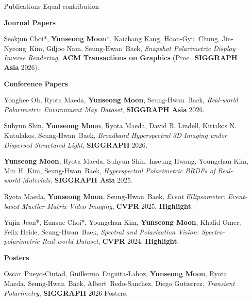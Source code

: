 \documentclass{cv}
\newcommand{\me}{\textbf{Yunseong Moon}}
\newcommand{\nm}[1]{\mbox{#1}}
\begin{document}
\begin{rSection}{Publications}
{\small * Equal contribution}

\textbf{Journal Papers}
\begin{refs}[label={[J\arabic*]}]
\item Seokjun Choi*, \me*, Kaizhang Kang, \nm{Hoon-Gyu Chung}, \nm{Jin-Nyeong Kim}, Giljoo Nam, \nm{Seung-Hwan Baek},
\emph{Snapshot Polarimetric Display Inverse Rendering},
\textbf{ACM Transactions on Graphics} (Proc.\ \textbf{SIGGRAPH Asia} 2026).
\end{refs}

\textbf{Conference Papers}
\begin{refs}[label={[C\arabic*]}]
\item Yonghee Oh, Ryota Maeda, \me, \nm{Seung-Hwan Baek},
\emph{Real-world Polarimetric Environment Map Dataset},
\textbf{SIGGRAPH Asia} 2026.

\item Suhyun Shin, \me, Ryota Maeda, David B. Lindell, Kiriakos N. Kutulakos, \nm{Seung-Hwan Baek},
\emph{Broadband Hyperspectral 3D Imaging under Dispersed Structured Light},
\textbf{SIGGRAPH} 2026.

\item \me, Ryota Maeda, Suhyun Shin, Inseung Hwang, Youngchan Kim, Min H. Kim, \nm{Seung-Hwan Baek},
\emph{Hyperspectral Polarimetric BRDFs of Real-world Materials},
\textbf{SIGGRAPH Asia} 2025.

\item Ryota Maeda, \me, \nm{Seung-Hwan Baek},
\emph{Event Ellipsometer: Event-based Mueller-Matrix Video Imaging},
\textbf{CVPR} 2025, \textbf{Highlight}.

\item Yujin Jeon*, Eunsue Choi*, Youngchan Kim, \me, Khalid Omer, Felix Heide, \nm{Seung-Hwan Baek},
\emph{Spectral and Polarization Vision: Spectro-polarimetric Real-world Dataset},
\textbf{CVPR} 2024, \textbf{Highlight}.
\end{refs}

\textbf{Posters}
\begin{refs}[label={[P\arabic*]}]
\item \nm{Oscar Pueyo-Ciutad}, \nm{Guillermo Enguita-Lahoz}, \me, Ryota Maeda, \nm{Seung-Hwan Baek}, \nm{Albert Redo-Sanchez}, Diego Gutierrez,
\emph{Transient Polarimetry},
\textbf{SIGGRAPH} 2026 Posters.
\end{refs}

\end{rSection}
\end{document}
